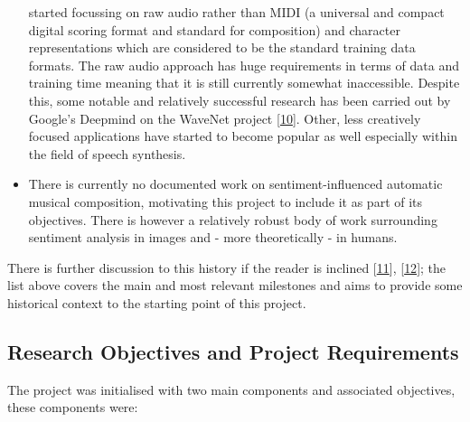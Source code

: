 \documentclass[12pt,]{article}
\begin{document}
\begin{itemize}
  started focussing on raw audio rather than MIDI (a universal and
  compact digital scoring format and standard for composition) and
  character representations which are considered to be the standard
  training data formats. The raw audio approach has huge requirements in
  terms of data and training time meaning that it is still currently
  somewhat inaccessible. Despite this, some notable and relatively
  successful research has been carried out by Google's Deepmind on the
  WaveNet project {[}\protect\hyperlink{ref-oord2016wavenet}{10}{]}.
  Other, less creatively focused applications have started to become
  popular as well especially within the field of speech synthesis.
\item
  There is currently no documented work on sentiment-influenced
  automatic musical composition, motivating this project to include it
  as part of its objectives. There is however a relatively robust body
  of work surrounding sentiment analysis in images and - more
  theoretically - in humans.
\end{itemize}

There is further discussion to this history if the reader is inclined
{[}\protect\hyperlink{ref-mediumkylemcdonald}{11}{]},
{[}\protect\hyperlink{ref-libdlmusic}{12}{]}; the list above covers the
main and most relevant milestones and aims to provide some historical
context to the starting point of this project.

\hypertarget{research-objectives-and-project-requirements}{%
\subsection{Research Objectives and Project
Requirements}\label{research-objectives-and-project-requirements}}

The project was initialised with two main components and associated
objectives, these components were:
\end{document}
